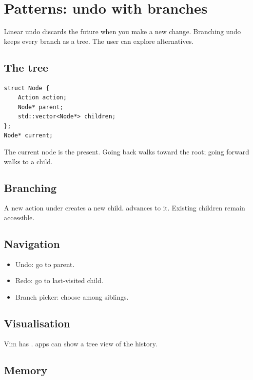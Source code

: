 \chapter{Patterns: undo with branches}
\label{ch:undobranches}

\begin{aside}
Linear undo discards the future when you make a new change.
Branching undo keeps every branch as a tree. The user can
explore alternatives.
\end{aside}

\section{The tree}

\begin{lstlisting}
struct Node {
    Action action;
    Node* parent;
    std::vector<Node*> children;
};
Node* current;
\end{lstlisting}

The current node is the present. Going back walks toward
the root; going forward walks to a child.

\section{Branching}

A new action under  creates a new child.
 advances to it. Existing children remain
accessible.

\section{Navigation}

\begin{itemize}[leftmargin=*]
  \item Undo: go to parent.
  \item Redo: go to last-visited child.
  \item Branch picker: choose among siblings.
\end{itemize}

\section{Visualisation}

Vim has . \maya{} apps can show a tree
view of the history.

\section{Memory}

